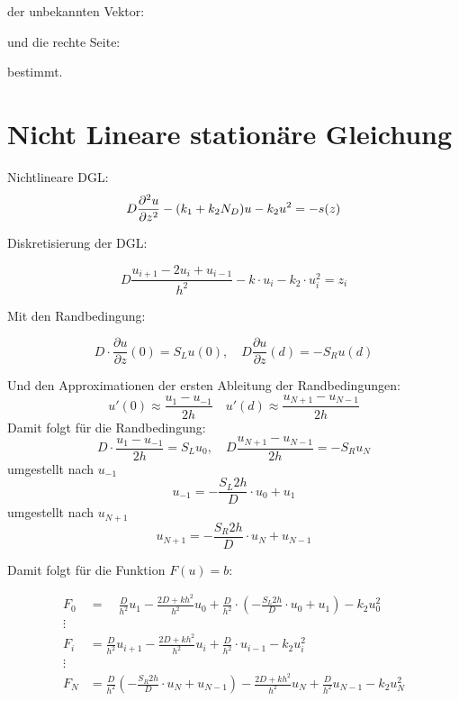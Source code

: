 der unbekannten Vektor:


und die rechte Seite:


bestimmt.

\section{Nicht Lineare stationäre Gleichung}
Nichtlineare DGL:
\begin{equation}
	D\pdv[2]{u}{z}-(k_1+k_2N_D)u-k_2u^2=-s(z)
\end{equation}

Diskretisierung der DGL:

\begin{equation}
	D\frac{u_{i+1}-2u_i+u_{i-1}}{h^2}-k\cdot u_i-k_2 \cdot u_i^2=z_i
\end{equation}

Mit den Randbedingung:

\begin{equation}
	D\cdot \frac{\partial u}{\partial z}(0)=S_Lu(0),\quad D\frac{\partial u}{\partial z}(d)=-S_Ru(d)
\end{equation}

Und den Approximationen der ersten Ableitung der  Randbedingungen:
\begin{equation}
	u'(0)\approx \frac{u_1-u_{-1}}{2h} \quad u'(d)\approx \frac{u_{N+1}-u_{N-1}}{2h}
\end{equation}
Damit folgt für die Randbedingung:
\begin{equation}
	D\cdot \frac{u_1-u_{-1}}{2h}=S_Lu_0,\quad D\frac{u_{N+1}-u_{N-1}}{2h}=-S_Ru_N
\end{equation}
umgestellt nach $u_{-1}$
\begin{equation}
	u_{-1}=-\frac{S_L 2h}{D}\cdot u_0+u_1
\end{equation}
umgestellt nach $u_{N+1}$
\begin{equation}
	u_{N+1}=-\frac{S_R2h}{D}\cdot u_N+u_{N-1}
\end{equation}



Damit folgt für die Funktion $F(u)=b$:

\begin{align*}
	F_0&= \quad \frac{D}{h^2}u_1-\frac{2D+kh^2}{h^2}u_0+\frac{D}{h^2}\cdot\left( -\frac{S_L 2h}{D}\cdot u_0+u_1\right) -k_2u_0^2\\
	\vdots \\
	F_i&= 	\frac{D}{h^2}u_{i+1}-\frac{2D+kh^2}{h^2}u_i+\frac{D}{h^2}\cdot u_{i-1} -k_2u_i^2\\
	\vdots \\
	F_N &= \frac{D}{h^2}\left( -\frac{S_R2h}{D}\cdot u_N+u_{N-1}\right) -\frac{2D+kh^2}{h^2}u_N+\frac{D}{h^2} u_{N-1}-k_2u^2_N\\
\end{align*}


